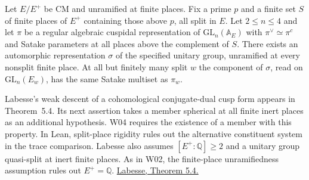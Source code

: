 
\begin{formalstatement}\label{sub:W04}
Let $E/E^+$ be CM and unramified at finite places. Fix a prime $p$ and a
finite set $S$ of finite places of $E^+$ containing those above $p$,
all split in $E$. Let $2\le n\le4$ and let $\pi$ be a regular algebraic
cuspidal representation of $\mathrm{GL}_n(\mathbb A_E)$ with
$\pi^\vee\simeq\pi^c$ and Satake parameters at all places above the
complement of $S$. There exists an automorphic representation $\sigma$ of
the specified unitary group, unramified at every nonsplit finite place.
At all but finitely many split $w$ the component of $\sigma$, read
on $\mathrm{GL}_n(E_w)$, has the same Satake multiset as $\pi_w$.
\end{formalstatement}
Labesse's weak descent of a cohomological conjugate-dual cusp form
appears in Theorem~5.4. Its next assertion takes a member spherical at
all finite inert places as an additional hypothesis. W04 requires the
existence of a member with this property. In Lean, split-place rigidity
rules out the alternative constituent system in the trace comparison. Labesse also assumes $[E^+:\mathbb Q]\ge2$ and a unitary group quasi-split at inert finite places. As in W02, the finite-place unramifiedness assumption rules out $E^+=\mathbb Q$.
\href{https://webusers.imj-prg.fr/~michael.harris/CBCM.pdf}{Labesse, Theorem 5.4.}~\cite{r21-labesse}
